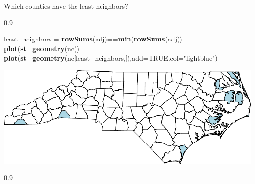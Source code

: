 \documentclass[11pt,ignorenonframetext,]{beamer}
\newenvironment{Shaded}{}{}
\newcommand{\KeywordTok}[1]{\textcolor[rgb]{0.00,0.44,0.13}{\textbf{#1}}}
\newcommand{\DataTypeTok}[1]{\textcolor[rgb]{0.56,0.13,0.00}{#1}}
\newcommand{\StringTok}[1]{\textcolor[rgb]{0.25,0.44,0.63}{#1}}
\newcommand{\OtherTok}[1]{\textcolor[rgb]{0.00,0.44,0.13}{#1}}
\newcommand{\OperatorTok}[1]{\textcolor[rgb]{0.40,0.40,0.40}{#1}}
\newcommand{\NormalTok}[1]{#1}
\let\oldShaded\Shaded
\let\endoldShaded\endShaded
\renewenvironment{Shaded}{\footnotesize\begin{spacing}{0.9}\oldShaded}{\endoldShaded\end{spacing}}
\begin{document}
\begin{frame}[fragile]{Which counties have the least neighbors?}

\begin{Shaded}
\begin{Highlighting}[]
\NormalTok{least_neighbors =}\StringTok{ }\KeywordTok{rowSums}\NormalTok{(adj)}\OperatorTok{==}\KeywordTok{min}\NormalTok{(}\KeywordTok{rowSums}\NormalTok{(adj)) }
\KeywordTok{plot}\NormalTok{(}\KeywordTok{st_geometry}\NormalTok{(nc))}
\KeywordTok{plot}\NormalTok{(}\KeywordTok{st_geometry}\NormalTok{(nc[least_neighbors,]),}\DataTypeTok{add=}\OtherTok{TRUE}\NormalTok{,}\DataTypeTok{col=}\StringTok{"lightblue"}\NormalTok{)}
\end{Highlighting}
\end{Shaded}

\begin{center}\includegraphics{Lec16_files/figure-beamer/unnamed-chunk-35-1} \end{center}

\begin{Shaded}
\end{Shaded}

\end{frame}
\end{document}
